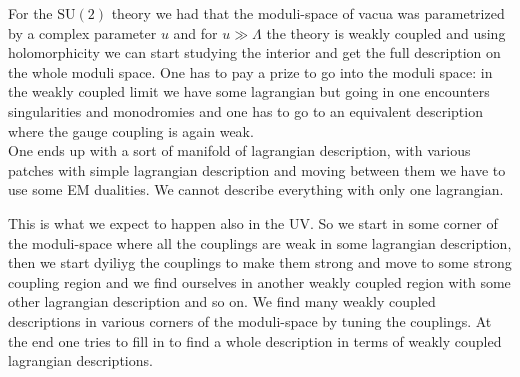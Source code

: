 \documentclass[11pt]{article}
\theoremstyle{definition}
\numberwithin{equation}{section}
\newcommand*\SU{\mathrm{SU}}
\begin{document}
For the $\SU(2)$ theory we had that the moduli-space of vacua was parametrized by a complex parameter $u$ and for $u\gg\Lambda$ the theory is weakly coupled and using holomorphicity we can start studying the interior and get the full description on the whole moduli space. One has to pay a prize to go into the moduli space: in the weakly coupled limit we have some lagrangian but going in one encounters singularities and monodromies and one has to go to an equivalent description where the gauge coupling is again weak.\\
One ends up with a sort of manifold of lagrangian description, with various patches with simple lagrangian description and moving between them we have to use some EM dualities. We cannot describe everything with only one lagrangian.

This is what we expect to happen also in the UV. So we start in some corner of the moduli-space where all the couplings are weak in some lagrangian description, then we start dyiliyg the couplings to make them strong and move to some strong coupling region and we find ourselves in another weakly coupled region with some other lagrangian description and so on. We find many weakly coupled descriptions in various corners of the moduli-space by tuning the couplings. At the end one tries to fill in to find a whole description in terms of weakly coupled lagrangian descriptions.
\end{document}
